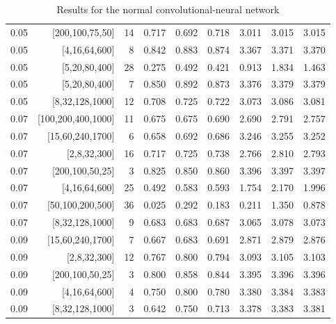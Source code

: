 \begin{table}[f]
\begin{tabular}{@{}rrrrrrrrr@{}}
0.05 & {[}200,100,75,50{]} & 14 & 0.717 & 0.692 & 0.718 & 3.011 & 3.015 & 3.015 \\
0.05 & {[}4,16,64,600{]} & 8 & 0.842 & 0.883 & 0.874 & 3.367 & 3.371 & 3.370 \\
0.05 & {[}5,20,80,400{]} & 28 & 0.275 & 0.492 & 0.421 & 0.913 & 1.834 & 1.463 \\
0.05 & {[}5,20,80,400{]} & 7 & 0.850 & 0.892 & 0.873 & 3.376 & 3.379 & 3.379 \\
0.05 & {[}8,32,128,1000{]} & 12 & 0.708 & 0.725 & 0.722 & 3.073 & 3.086 & 3.081 \\
0.07 & {[}100,200,400,1000{]} & 11 & 0.675 & 0.675 & 0.690 & 2.690 & 2.791 & 2.757 \\
0.07 & {[}15,60,240,1700{]} & 6 & 0.658 & 0.692 & 0.686 & 3.246 & 3.255 & 3.252 \\
0.07 & {[}2,8,32,300{]} & 16 & 0.717 & 0.725 & 0.738 & 2.766 & 2.810 & 2.793 \\
0.07 & {[}200,100,50,25{]} & 3 & 0.825 & 0.850 & 0.860 & 3.396 & 3.397 & 3.397 \\
0.07 & {[}4,16,64,600{]} & 25 & 0.492 & 0.583 & 0.593 & 1.754 & 2.170 & 1.996 \\
0.07 & {[}50,100,200,500{]} & 36 & 0.025 & 0.292 & 0.183 & 0.211 & 1.350 & 0.878 \\
0.07 & {[}8,32,128,1000{]} & 9 & 0.683 & 0.683 & 0.687 & 3.065 & 3.078 & 3.073 \\
0.09 & {[}15,60,240,1700{]} & 7 & 0.667 & 0.683 & 0.691 & 2.871 & 2.879 & 2.876 \\
0.09 & {[}2,8,32,300{]} & 12 & 0.767 & 0.800 & 0.794 & 3.093 & 3.105 & 3.103 \\
0.09 & {[}200,100,50,25{]} & 3 & 0.800 & 0.858 & 0.844 & 3.395 & 3.396 & 3.396 \\
0.09 & {[}4,16,64,600{]} & 4 & 0.750 & 0.800 & 0.780 & 3.380 & 3.384 & 3.383 \\
0.09 & {[}8,32,128,1000{]} & 3 & 0.642 & 0.750 & 0.713 & 3.378 & 3.383 & 3.381 \\ \bottomrule
\end{tabular}
\caption{Results for the normal convolutional-neural network}
\label{tab:cnn}
\end{table}



